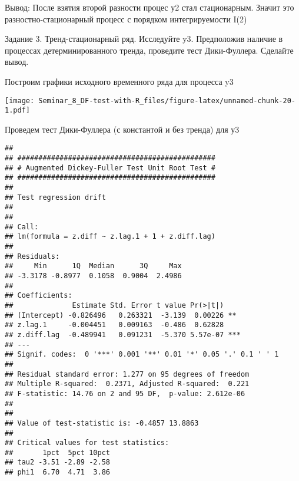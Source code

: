 \documentclass[
]{article}
\newenvironment{Shaded}{\begin{snugshade}}{\end{snugshade}}
\newcommand{\AttributeTok}[1]{\textcolor[rgb]{0.13,0.29,0.53}{#1}}
\newcommand{\FunctionTok}[1]{\textcolor[rgb]{0.13,0.29,0.53}{\textbf{#1}}}
\newcommand{\NormalTok}[1]{#1}
\newcommand{\SpecialCharTok}[1]{\textcolor[rgb]{0.81,0.36,0.00}{\textbf{#1}}}
\newcommand{\StringTok}[1]{\textcolor[rgb]{0.31,0.60,0.02}{#1}}
\begin{document}
Вывод: После взятия второй разности процес у2 стал стационарным. Значит
это разностно-стационарный процесс с порядком интегрируемости I(2)

Задание 3. Тренд-стационарный ряд. Исследуйте y3. Предположив наличие в
процессах детерминированного тренда, проведите тест Дики-Фуллера.
Сделайте вывод.

Построим графики исходного временного ряда для процесса y3

\begin{Shaded}
\end{Shaded}

\texttt{[image: Seminar\_8\_DF-test-with-R\_files/figure-latex/unnamed-chunk-20-1.pdf]}

Проведем тест Дики-Фуллера (с константой и без тренда) для у3

\begin{Shaded}
\end{Shaded}

\begin{verbatim}
## 
## ############################################### 
## # Augmented Dickey-Fuller Test Unit Root Test # 
## ############################################### 
## 
## Test regression drift 
## 
## 
## Call:
## lm(formula = z.diff ~ z.lag.1 + 1 + z.diff.lag)
## 
## Residuals:
##     Min      1Q  Median      3Q     Max 
## -3.3178 -0.8977  0.1058  0.9004  2.4986 
## 
## Coefficients:
##              Estimate Std. Error t value Pr(>|t|)    
## (Intercept) -0.826496   0.263321  -3.139  0.00226 ** 
## z.lag.1     -0.004451   0.009163  -0.486  0.62828    
## z.diff.lag  -0.489941   0.091231  -5.370 5.57e-07 ***
## ---
## Signif. codes:  0 '***' 0.001 '**' 0.01 '*' 0.05 '.' 0.1 ' ' 1
## 
## Residual standard error: 1.277 on 95 degrees of freedom
## Multiple R-squared:  0.2371, Adjusted R-squared:  0.221 
## F-statistic: 14.76 on 2 and 95 DF,  p-value: 2.612e-06
## 
## 
## Value of test-statistic is: -0.4857 13.8863 
## 
## Critical values for test statistics: 
##       1pct  5pct 10pct
## tau2 -3.51 -2.89 -2.58
## phi1  6.70  4.71  3.86
\end{verbatim}
\end{document}
